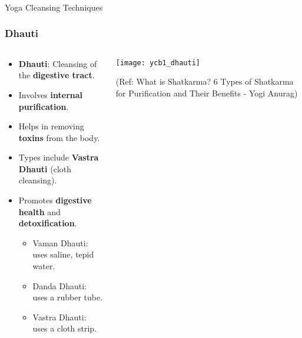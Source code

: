 

\begin{frame}[fragile]\frametitle{}
\begin{center}
{\Large Yoga Cleansing Techniques}
\end{center}
\end{frame}

\begin{frame}[fragile]\frametitle{Dhauti}
\begin{columns}
    \begin{column}[T]{0.5\linewidth}
      \begin{itemize}
        \item \textbf{Dhauti}: Cleansing of the \textbf{digestive tract}.
        \item Involves \textbf{internal purification}.
        \item Helps in removing \textbf{toxins} from the body.
        \item Types include \textbf{Vastra Dhauti} (cloth cleansing).
        \item Promotes \textbf{digestive health} and \textbf{detoxification}.
		\begin{itemize}
		  \item Vaman Dhauti: uses saline, tepid water.
		  \item Danda Dhauti: uses a rubber tube.
		  \item Vastra Dhauti: uses a cloth strip.
		\end{itemize}		
      \end{itemize}
    \end{column}
    \begin{column}[T]{0.5\linewidth}
        \begin{center}
        \texttt{[image: ycb1\_dhauti]}
		
		{\tiny (Ref: What is Shatkarma? 6 Types of Shatkarma for Purification and Their Benefits - Yogi Anurag)}	
        \end{center}	
    \end{column}
\end{columns}
\end{frame}

